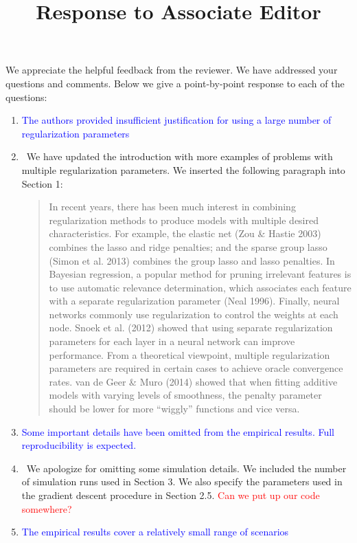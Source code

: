 \documentclass[]{article}
\title{Response to Associate Editor}
\newcommand{\point}[1]{\item \textcolor{blue}{#1}}
\newcommand{\reply}{\item[]\ }
\begin{document}
	\maketitle
		
	We appreciate the helpful feedback from the reviewer. We have addressed your questions and comments. Below we give a point-by-point response to each of the questions:
		
	\begin{enumerate}
		\point{The authors provided insufficient justification for using a large number of regularization parameters}

		\reply  We have updated the introduction with more examples of problems with multiple regularization parameters. We inserted the following paragraph into Section 1:
		
		\begin{quote}
			In recent years, there has been much interest in combining regularization methods to produce models with multiple desired characteristics. For example, the elastic net (Zou \& Hastie 2003) combines the lasso and ridge penalties; and the sparse group lasso (Simon et al. 2013) combines the group lasso and lasso penalties. In Bayesian regression, a popular method for pruning irrelevant features is to use automatic relevance determination, which associates each feature with a separate regularization parameter (Neal 1996). Finally, neural networks commonly use regularization to control the weights at each node. Snoek et al. (2012) showed that using separate regularization parameters for each layer in a neural network can improve performance. From a theoretical viewpoint, multiple regularization parameters are required in certain cases to achieve oracle convergence rates. van de Geer \& Muro (2014) showed that when fitting additive models with varying levels of smoothness, the penalty parameter should be lower for more ``wiggly'' functions and vice versa. 
		\end{quote}
		
		\point{Some important details have been omitted from the empirical results. Full reproducibility is expected.}
		
		\reply We apologize for omitting some simulation details. We included the number of simulation runs used in Section 3. We also specify the parameters used in the gradient descent procedure in Section 2.5. \textcolor{red}{Can we put up our code somewhere?}
		
		\point{The empirical results cover a relatively small range of scenarios}
		

\end{enumerate}
\end{document}
